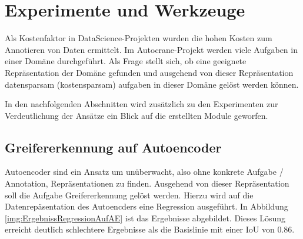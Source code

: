 \chapter{Experimente und Werkzeuge}
\label{chap:HauptteilMultiTaskLernen}
Als Kostenfaktor in DataScience-Projekten wurden die hohen Kosten zum Annotieren von Daten ermittelt. Im Autocrane-Projekt werden viele Aufgaben in einer Domäne durchgeführt. Als Frage stellt sich, ob eine geeignete Repräsentation der Domäne gefunden und ausgehend von dieser Repräsentation datensparsam (kostensparsam) aufgaben in dieser Domäne gelöst werden können.  

In den nachfolgenden Abschnitten wird zusätzlich zu den Experimenten zur Verdeutlichung der Ansätze ein Blick auf die erstellten Module geworfen.

	\section{Greifererkennung auf Autoencoder}
	\label{sec:GreifererkennungAufAutoencoder}
    Autoencoder sind ein Ansatz um unüberwacht, also ohne konkrete Aufgabe / Annotation, Repräsentationen zu finden. Ausgehend von dieser Repräsentation soll die  Aufgabe Greifererkennung gelöst werden. Hierzu wird auf die Datenrepäsentation des Autoencders eine Regression ausgeführt. In Abbildung \ref{img:ErgebnissRegressionAufAE} ist das Ergebnisse abgebildet. Dieses Lösung erreicht deutlich schlechtere Ergebnisse als die Basislinie mit einer IoU von $0.86$.
    
